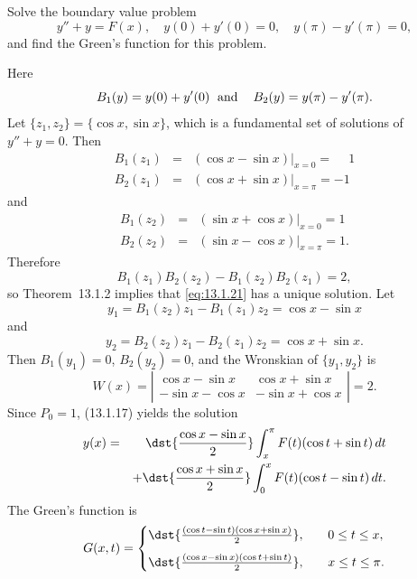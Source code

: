 \setcounter{example}{5}
\setcounter{equation}{20}
\begin{example}
  \label{example:13.1.6}\rm Solve the boundary value problem
  \begin{equation}
    \label{eq:13.1.21}y''+y=F(x),\quad y(0)+y'(0)=0,\quad y(\pi)-y'(\pi)=0,
  \end{equation}
  and find the Green's function for this problem.
\end{example}
\begin{examplesolution}
\solution Here
\[
  B_{1}(y)=y(0)+y'(0)\text{\; and\; \; }B_{2}(y)=y(\pi)-y'(\pi).
\]
Let $\{z_{1},z_{2}\}=\{\cos x,\sin x\}$, which is a fundamental set of solutions of $y''+y=0$. Then
\begin{eqnarray*}
  B_{1}(z_{1}) & = & (\cos x-\sin x)\big|_{x=0}=\phantom{-}1 \\
  B_{2}(z_{1}) & = & (\cos x+\sin x)\big|_{x=\pi}=-1
\end{eqnarray*}
and
\begin{eqnarray*}
  B_{1}(z_{2}) & = & (\sin x+\cos x)\big|_{x=0}=1 \\
  B_{2}(z_{2}) & = & (\sin x-\cos x)\big|_{x=\pi}=1.
\end{eqnarray*}
Therefore
\[
  B_{1}(z_{1})B_{2}(z_{2})-B_{1}(z_{2})B_{2}(z_{1})=2,
\]
so Theorem~13.1.2 implies that \eqref{eq:13.1.21} has a unique solution. Let
\[
  y_{1}=B_{1}(z_{2})z_{1}-B_{1}(z_{1})z_{2}=\cos x-\sin x
\]
and
\[
  y_{2}=B_{2}(z_{2})z_{1}-B_{2}(z_{1})z_{2}=\cos x+\sin x.
\]
Then $B_{1}(y_{1})=0$, $B_{2}(y_{2})=0$, and the Wronskian of $\{y_{1},y_{2}\}$ is
\[
  W(x)= \left|
  \begin{array}{rrccccc}
    \cos x-\sin x  & \cos x+\sin x  \\
    -\sin x-\cos x & -\sin x+\cos x
  \end{array}\right|=2.
\]
Since $P_{0}=1$, \textup{(13.1.17)} yields the solution
\begin{eqnarray*}
  y(x) & = & \dst{\frac{\cos x-\sin x}{2}}\int_{x}^{\pi}F(t)(\cos t+\sin t)\,dt \\
       &   & +\dst{\frac{\cos x+\sin x}{2}}\int_{0}^{x}F(t)(\cos t-\sin t)\,dt.
\end{eqnarray*}
The Green's function is
\[
  G(x,t)=
  \begin{cases}
    \dst{\frac{(\cos t-\sin t)(\cos x+\sin x)}{2}}, & \quad0\le t\le x,   \\[.1in]
    \dst{\frac{(\cos x-\sin x)(\cos t+\sin t)}{2}}, & \quad x\le t\le\pi.
  \end{cases}
\]
\end{examplesolution}


